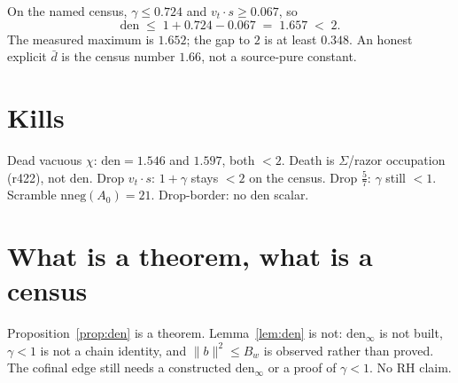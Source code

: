 \documentclass[11pt]{article}
\theoremstyle{remark}
\begin{document}
On the named census,
$\gamma\le 0.724$ and $v_t\cdot s\ge 0.067$, so
\[
\mathrm{den}\;\le\;1+0.724-0.067\;=\;1.657\;<\;2.
\]
The measured maximum is $1.652$; the gap to $2$ is
at least $0.348$.
An honest explicit $\bar d$ is the census number
$1.66$, not a source-pure constant.

\section{Kills}\label{sec:kills}

Dead vacuous $\chi$: $\mathrm{den}=1.546$ and
$1.597$, both $<2$.
Death is $\Sigma$/razor occupation (r422), not
$\mathrm{den}$.
Drop $v_t\cdot s$: $1+\gamma$ stays $<2$ on the
census.
Drop $\tfrac57$: $\gamma$ still $<1$.
Scramble $\mathrm{nneg}(A_0)=21$.
Drop-border: no $\mathrm{den}$ scalar.

\section{What is a theorem, what is a census}\label{sec:honest}

Proposition~\ref{prop:den} is a theorem.
Lemma~\ref{lem:den} is not:
$\mathrm{den}_\infty$ is not built,
$\gamma<1$ is not a chain identity,
and $\|b\|^2\le B_w$ is observed rather than
proved.
The cofinal edge still needs a constructed
$\mathrm{den}_\infty$ or a proof of $\gamma<1$.
No RH claim.
\end{document}
